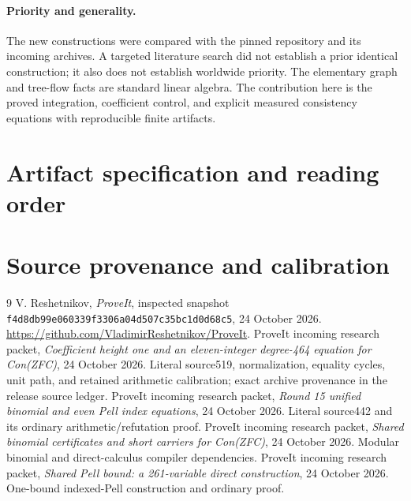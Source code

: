 \documentclass[11pt]{article}
\theoremstyle{definition}\newtheorem{definition}[theorem]{Definition}
\theoremstyle{remark}\newtheorem{remark}[theorem]{Remark}
\begin{document}
\paragraph{Priority and generality.}
The new constructions were compared with the pinned repository and its incoming
archives. A targeted literature search did not establish a prior identical
construction; it also does not establish worldwide priority. The elementary
graph and tree-flow facts are standard linear algebra. The contribution here
is the proved integration, coefficient control, and explicit measured
consistency equations with reproducible finite artifacts.

\appendix
\section{Artifact specification and reading order}


\section{Source provenance and calibration}




\begin{thebibliography}{9}
 V. Reshetnikov, \emph{ProveIt}, inspected snapshot
\texttt{f4d8db99e060339f3306a04d507c35bc1d0d68c5}, 24 October 2026.
\url{https://github.com/VladimirReshetnikov/ProveIt}.
 ProveIt incoming research packet,
\emph{Coefficient height one and an eleven-integer degree-464 equation for
Con(ZFC)}, 24 October 2026. Literal source519, normalization, equality cycles,
unit path, and retained arithmetic calibration; exact archive provenance in the
release source ledger.
 ProveIt incoming research packet,
\emph{Round 15 unified binomial and even Pell index equations}, 24 October 2026.
Literal source442 and its ordinary arithmetic/refutation proof.
 ProveIt incoming research packet,
\emph{Shared binomial certificates and short carriers for Con(ZFC)},
24 October 2026. Modular binomial and direct-calculus compiler dependencies.
 ProveIt incoming research packet,
\emph{Shared Pell bound: a 261-variable direct construction},
24 October 2026. One-bound indexed-Pell construction and ordinary proof.
\end{thebibliography}
\end{document}
